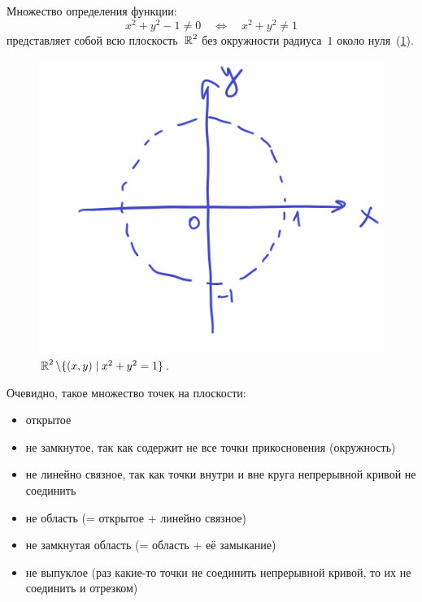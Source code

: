 \documentclass[a4paper,12pt]{article}
\newcommand{\cmark}{\ding{51}}
\newcommand{\xmark}{\ding{55}}
\newcommand{\done}{\rlap{$\square$}{\raisebox{2pt}{\large\hspace{1pt}\cmark}}%
\hspace{-2.5pt}}
\newcommand{\failed}{\rlap{$\square$}{\large\hspace{1pt}\xmark}}
\begin{document}
  \begin{solution}  
    Множество определения функции:
    \[
      x^2 + y^2 - 1 \not= 0 \quad\Leftrightarrow\quad x^2 + y^2 \not= 1
    \]
    представляет собой всю плоскость~$\operatorname{\mathbb R}^2$ без окружности радиуса~$1$ около нуля~(\ref{fig:R2-no-circ}).

    \begin{figure}[ht]
      \centering
  
      \includegraphics[width=0.5\columnwidth]{R2-no-circ}
  
      \caption{
        $\RR^2 \hm\setminus \{(x, y) \mid x^2 + y^2 = 1\}$.
      }
      \label{fig:R2-no-circ}
    \end{figure}

    Очевидно, такое множество точек на плоскости:
    \begin{itemize}
      \item открытое
      \item не замкнутое, так как содержит не все точки прикосновения (окружность)
      \item не линейно связное, так как точки внутри и вне круга непрерывной кривой не соединить
      \item не область (= открытое + линейно связное)
      \item не замкнутая область (= область + её замыкание)
      \item не выпуклое (раз какие-то точки не соединить непрерывной кривой, то их не соединить и отрезком)
    \end{itemize}
  \end{solution}
\end{document}
